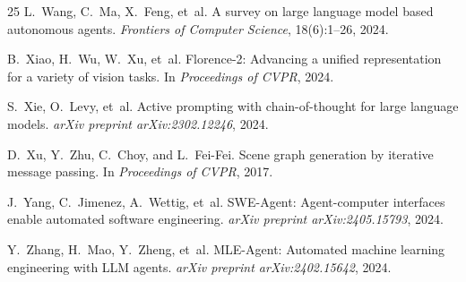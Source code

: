 \documentclass[11pt]{article}
\begin{document}
\begin{thebibliography}{25}
L.~Wang, C.~Ma, X.~Feng, et~al.
\newblock A survey on large language model based autonomous agents.
\newblock \emph{Frontiers of Computer Science}, 18(6):1--26, 2024.

B.~Xiao, H.~Wu, W.~Xu, et~al.
\newblock Florence-2: Advancing a unified representation for a variety of vision tasks.
\newblock In \emph{Proceedings of CVPR}, 2024.

S.~Xie, O.~Levy, et~al.
\newblock Active prompting with chain-of-thought for large language models.
\newblock \emph{arXiv preprint arXiv:2302.12246}, 2024.

D.~Xu, Y.~Zhu, C.~Choy, and L.~Fei-Fei.
\newblock Scene graph generation by iterative message passing.
\newblock In \emph{Proceedings of CVPR}, 2017.

J.~Yang, C.~Jimenez, A.~Wettig, et~al.
\newblock SWE-Agent: Agent-computer interfaces enable automated software engineering.
\newblock \emph{arXiv preprint arXiv:2405.15793}, 2024.

Y.~Zhang, H.~Mao, Y.~Zheng, et~al.
\newblock MLE-Agent: Automated machine learning engineering with LLM agents.
\newblock \emph{arXiv preprint arXiv:2402.15642}, 2024.

\end{thebibliography}
\end{document}
